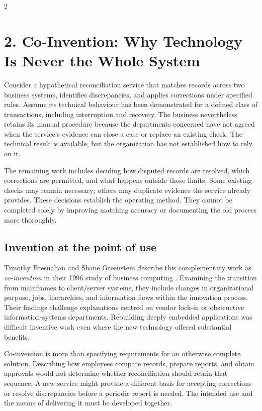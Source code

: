 \clearpage
\begin{multicols}{2}

\section{2. Co-Invention: Why Technology Is Never the Whole
System}\label{co-invention-why-technology-is-never-the-whole-system}

Consider a hypothetical reconciliation service that matches records
across two business systems, identifies discrepancies, and applies
corrections under specified rules. Assume its technical behaviour has
been demonstrated for a defined class of transactions, including
interruption and recovery. The business nevertheless retains its manual
procedure because the departments concerned have not agreed when the
service's evidence can close a case or replace an existing check. The
technical result is available, but the organization has not established
how to rely on it.

The remaining work includes deciding how disputed records are resolved,
which corrections are permitted, and what happens outside those limits.
Some existing checks may remain necessary; others may duplicate evidence
the service already provides. These decisions establish the operating
method. They cannot be completed solely by improving matching accuracy
or documenting the old process more thoroughly.

\subsection{Invention at the point of
use}\label{invention-at-the-point-of-use}

Timothy Bresnahan and Shane Greenstein describe this complementary work
as \emph{co-invention} in their 1996 study of business computing
\citep{bresnahan1996coinvention}. Examining the transition from
mainframes to client/server systems, they include changes in
organizational purpose, jobs, hierarchies, and information flows within
the innovation process. Their findings challenge explanations centred on
vendor lock-in or obstructive information-systems departments.
Rebuilding deeply embedded applications was difficult inventive work
even where the new technology offered substantial benefits.

Co-invention is more than specifying requirements for an otherwise
complete solution. Describing how employees compare records, prepare
reports, and obtain approvals would not determine whether reconciliation
should retain that sequence. A new service might provide a different
basis for accepting corrections or resolve discrepancies before a
periodic report is needed. The intended use and the means of delivering
it must be developed together.


\end{multicols}
